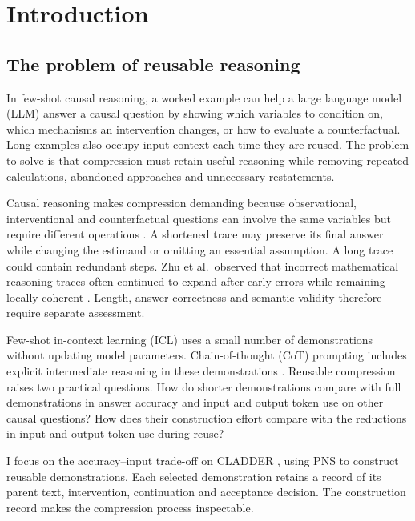 \chapter{Introduction}\label{ch:1}

\section{The problem of reusable reasoning}\label{sec:1.1}

In few-shot causal reasoning, a worked example can help a large language model (LLM) answer a causal question by showing which variables to condition on, which mechanisms an intervention changes, or how to evaluate a counterfactual. Long examples also occupy input context each time they are reused. The problem to solve is that compression must retain useful reasoning while removing repeated calculations, abandoned approaches and unnecessary restatements.

Causal reasoning makes compression demanding because observational, interventional and counterfactual questions can involve the same variables but require different operations \cite{Pearl_2009,NEURIPS2023_631bb943}. A shortened trace may preserve its final answer while changing the estimand or omitting an essential assumption. A long trace could contain redundant steps. Zhu et al.\ observed that incorrect mathematical reasoning traces often continued to expand after early errors while remaining locally coherent \cite{zhu2026failure}. Length, answer correctness and semantic validity therefore require separate assessment.

Few-shot in-context learning (ICL) uses a small number of demonstrations without updating model parameters. Chain-of-thought (CoT) prompting includes explicit intermediate reasoning in these demonstrations \cite{NEURIPS2022_9d560961}. Reusable compression raises two practical questions. How do shorter demonstrations compare with full demonstrations in answer accuracy and input and output token use on other causal questions? How does their construction effort compare with the reductions in input and output token use during reuse?

I focus on the accuracy--input trade-off on CLADDER \cite{NEURIPS2023_631bb943}, using PNS to construct reusable demonstrations. Each selected demonstration retains a record of its parent text, intervention, continuation and acceptance decision. The construction record makes the compression process inspectable.

